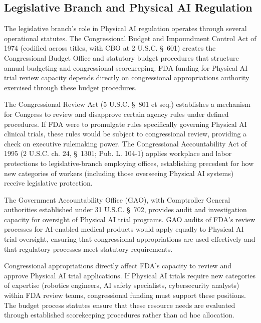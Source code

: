 \subsection{Legislative Branch and Physical AI Regulation}
\label{subsec:legislative}

The legislative branch's role in Physical AI regulation operates through several
operational statutes. The Congressional Budget and Impoundment Control Act of
1974 (codified across titles, with CBO at 2 U.S.C. \S~601) creates the
Congressional Budget Office and statutory budget procedures that structure
annual budgeting and congressional scorekeeping. FDA funding for Physical AI
trial review capacity depends directly on congressional appropriations authority
exercised through these budget procedures.

The Congressional Review Act (5 U.S.C. \S~801 et seq.) establishes a mechanism
for Congress to review and disapprove certain agency rules under defined
procedures. If FDA were to promulgate rules specifically governing Physical AI
clinical trials, these rules would be subject to congressional review,
providing a check on executive rulemaking power. The Congressional
Accountability Act of 1995 (2 U.S.C. ch. 24, \S~1301; Pub. L. 104-1) applies
workplace and labor protections to legislative-branch employing offices,
establishing precedent for how new categories of workers (including those
overseeing Physical AI systems) receive legislative protection.

The Government Accountability Office (GAO), with Comptroller General
authorities established under 31 U.S.C. \S~702, provides audit and
investigation capacity for oversight of Physical AI trial programs. GAO audits
of FDA's review processes for AI-enabled medical products would apply equally
to Physical AI trial oversight, ensuring that congressional appropriations are
used effectively and that regulatory processes meet statutory requirements.

Congressional appropriations directly affect FDA's capacity to review and
approve Physical AI trial applications. If Physical AI trials require new
categories of expertise (robotics engineers, AI safety specialists,
cybersecurity analysts) within FDA review teams, congressional funding must
support these positions. The budget process statutes ensure that these resource
needs are evaluated through established scorekeeping procedures rather than
ad hoc allocation.


